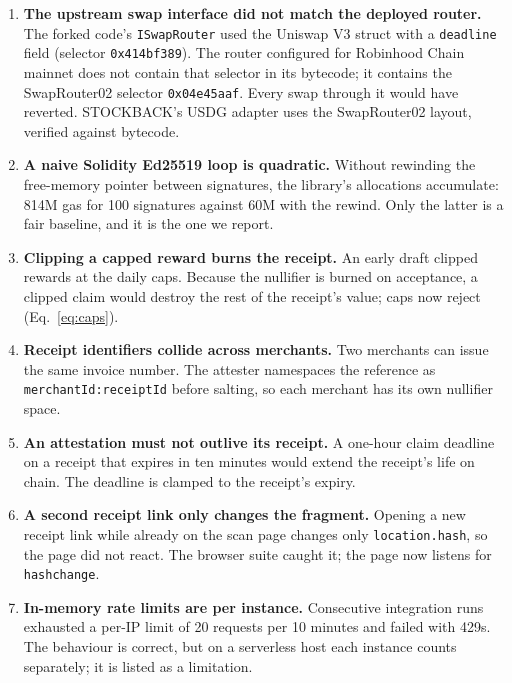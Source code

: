 \documentclass[10.5pt,letterpaper]{article}
\theoremstyle{definition}
\theoremstyle{remark}
\newcommand{\ttt}[1]{\texttt{#1}}
\begin{document}
\begin{enumerate}[leftmargin=*]
  \item \textbf{The upstream swap interface did not match the deployed router.} The forked code's \ttt{ISwapRouter} used
        the Uniswap V3 struct with a \ttt{deadline} field (selector \ttt{0x414bf389}). The router configured for Robinhood
        Chain mainnet does not contain that selector in its bytecode; it contains the SwapRouter02 selector \ttt{0x04e45aaf}.
        Every swap through it would have reverted. STOCKBACK's USDG adapter uses the SwapRouter02 layout, verified against
        bytecode.
  \item \textbf{A naive Solidity Ed25519 loop is quadratic.} Without rewinding the free-memory pointer between signatures,
        the library's allocations accumulate: 814M gas for 100 signatures against 60M with the rewind. Only the latter is a
        fair baseline, and it is the one we report.
  \item \textbf{Clipping a capped reward burns the receipt.} An early draft clipped rewards at the daily caps. Because the
        nullifier is burned on acceptance, a clipped claim would destroy the rest of the receipt's value; caps now reject (Eq.~\ref{eq:caps}).
  \item \textbf{Receipt identifiers collide across merchants.} Two merchants can issue the same invoice number. The attester
        namespaces the reference as \ttt{merchantId:receiptId} before salting, so each merchant has its own nullifier space.
  \item \textbf{An attestation must not outlive its receipt.} A one-hour claim deadline on a receipt that expires in ten
        minutes would extend the receipt's life on chain. The deadline is clamped to the receipt's expiry.
  \item \textbf{A second receipt link only changes the fragment.} Opening a new receipt link while already on the scan page
        changes only \ttt{location.hash}, so the page did not react. The browser suite caught it; the page now listens for
        \ttt{hashchange}.
  \item \textbf{In-memory rate limits are per instance.} Consecutive integration runs exhausted a per-IP limit of 20 requests per
        10 minutes and failed with 429s. The behaviour is correct, but on a serverless host each instance counts separately; it is
        listed as a limitation.
\end{enumerate}

\end{document}

